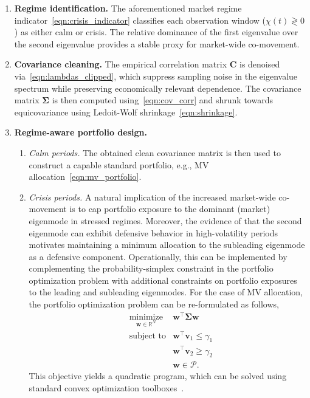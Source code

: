 \documentclass[pdflatex,sn-basic]{sn-jnl}%
\theoremstyle{thmstyleone}%
\theoremstyle{thmstyletwo}%
\theoremstyle{thmstylethree}%
\newcommand{\bw}{\boldsymbol{w}}
\newcommand{\bv}{\boldsymbol{v}}
\newcommand{\bC}{\boldsymbol{C}}
\newcommand{\bSigma}{\boldsymbol{\Sigma}}
\newcommand{\real}[1]{\mathds{R}^{#1}}
\newcommand{\calP}{\mathcal{P}}
\begin{document}
\begin{enumerate}
    \item \textbf{Regime identification.} The aforementioned market regime 
    indicator~\eqref{eqn:crisis_indicator} classifies each observation window 
    ($\chi(t)\gtrless0$) as either calm or crisis. The relative dominance 
    of the first eigenvalue over the second eigenvalue provides a stable proxy for 
    market-wide co-movement.

    \item \textbf{Covariance cleaning.} The empirical correlation matrix $\bC$ is denoised 
    via~\eqref{eqn:lambdas_clipped},  which suppress sampling noise in the eigenvalue spectrum 
    while preserving economically relevant dependence. The covariance matrix $\bSigma$
    is then computed using~\eqref{eqn:cov_corr} and shrunk towards equicovariance using Ledoit-Wolf 
    shrinkage~\eqref{eqn:shrinkage}.

    \item \textbf{Regime-aware portfolio design.}
    \begin{enumerate}
        \item \emph{Calm periods.} The obtained clean covariance matrix is then
        used to construct a capable standard portfolio, e.g., MV allocation~\eqref{eqn:mv_portfolio}.
        \item \emph{Crisis periods.} A natural implication of the increased market-wide co-movement 
        is to cap portfolio exposure to the dominant (market) eigenmode 
        in stressed regimes. Moreover, the evidence of \citet{molero2025random} that the second 
        eigenmode can exhibit defensive behavior in high-volatility periods motivates 
        maintaining a minimum allocation to the subleading eigenmode as a defensive component. 
        Operationally, this can be implemented by complementing the probability-simplex constraint 
        in the portfolio optimization problem with additional constraints on portfolio exposures to 
        the leading and subleading eigenmodes. For the case of MV allocation, the portfolio 
        optimization problem can be re-formulated as follows,
        \begin{equation}
        \label{eqn:regime_aware_problem}
            \begin{aligned}
                & \underset{\bw\in\real{N}}{\textrm{minimize}} & \bw^{\top} \bSigma \bw\\
                & \textrm{subject to} & \bw^{\top} \bv_1 \leq \gamma_1 \\
                & & \bw^{\top} \bv_2 \geq \gamma_2 \\
                & & \bw \in \calP.
            \end{aligned}
        \end{equation}
        This objective yields a quadratic program, which can be solved using standard convex 
        optimization toolboxes~\citep[see, e.g.,][]{grant2009cvx, mathworks2025quadprog}.
    \end{enumerate}
\end{enumerate}
\end{document}
